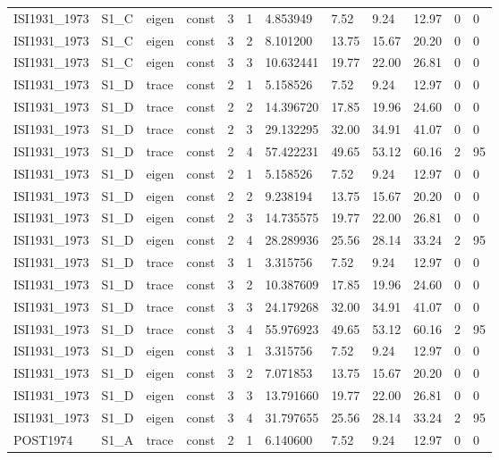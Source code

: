 \begin{tabular}{llllllllllll}
ISI1931\_1973 & S1\_C & eigen & const & 3 & 1 & 4.853949 & 7.52 & 9.24 & 12.97 & 0 & 0 \\
ISI1931\_1973 & S1\_C & eigen & const & 3 & 2 & 8.101200 & 13.75 & 15.67 & 20.20 & 0 & 0 \\
ISI1931\_1973 & S1\_C & eigen & const & 3 & 3 & 10.632441 & 19.77 & 22.00 & 26.81 & 0 & 0 \\
ISI1931\_1973 & S1\_D & trace & const & 2 & 1 & 5.158526 & 7.52 & 9.24 & 12.97 & 0 & 0 \\
ISI1931\_1973 & S1\_D & trace & const & 2 & 2 & 14.396720 & 17.85 & 19.96 & 24.60 & 0 & 0 \\
ISI1931\_1973 & S1\_D & trace & const & 2 & 3 & 29.132295 & 32.00 & 34.91 & 41.07 & 0 & 0 \\
ISI1931\_1973 & S1\_D & trace & const & 2 & 4 & 57.422231 & 49.65 & 53.12 & 60.16 & 2 & 95 \\
ISI1931\_1973 & S1\_D & eigen & const & 2 & 1 & 5.158526 & 7.52 & 9.24 & 12.97 & 0 & 0 \\
ISI1931\_1973 & S1\_D & eigen & const & 2 & 2 & 9.238194 & 13.75 & 15.67 & 20.20 & 0 & 0 \\
ISI1931\_1973 & S1\_D & eigen & const & 2 & 3 & 14.735575 & 19.77 & 22.00 & 26.81 & 0 & 0 \\
ISI1931\_1973 & S1\_D & eigen & const & 2 & 4 & 28.289936 & 25.56 & 28.14 & 33.24 & 2 & 95 \\
ISI1931\_1973 & S1\_D & trace & const & 3 & 1 & 3.315756 & 7.52 & 9.24 & 12.97 & 0 & 0 \\
ISI1931\_1973 & S1\_D & trace & const & 3 & 2 & 10.387609 & 17.85 & 19.96 & 24.60 & 0 & 0 \\
ISI1931\_1973 & S1\_D & trace & const & 3 & 3 & 24.179268 & 32.00 & 34.91 & 41.07 & 0 & 0 \\
ISI1931\_1973 & S1\_D & trace & const & 3 & 4 & 55.976923 & 49.65 & 53.12 & 60.16 & 2 & 95 \\
ISI1931\_1973 & S1\_D & eigen & const & 3 & 1 & 3.315756 & 7.52 & 9.24 & 12.97 & 0 & 0 \\
ISI1931\_1973 & S1\_D & eigen & const & 3 & 2 & 7.071853 & 13.75 & 15.67 & 20.20 & 0 & 0 \\
ISI1931\_1973 & S1\_D & eigen & const & 3 & 3 & 13.791660 & 19.77 & 22.00 & 26.81 & 0 & 0 \\
ISI1931\_1973 & S1\_D & eigen & const & 3 & 4 & 31.797655 & 25.56 & 28.14 & 33.24 & 2 & 95 \\
POST1974 & S1\_A & trace & const & 2 & 1 & 6.140600 & 7.52 & 9.24 & 12.97 & 0 & 0 \\

\end{tabular}
